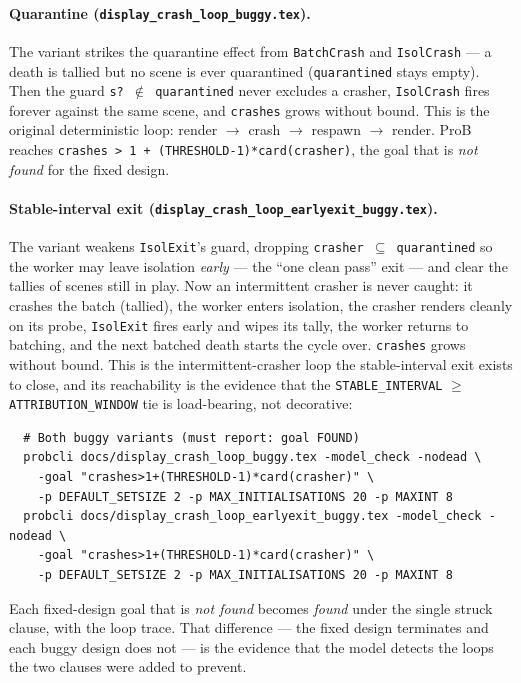 \documentclass[a4paper,10pt,fleqn]{article}
\begin{document}
\paragraph{Quarantine (\texttt{display\_crash\_loop\_buggy.tex}).}
The variant strikes the quarantine effect from \texttt{BatchCrash} and
\texttt{IsolCrash} --- a death is tallied but no scene is ever quarantined
(\texttt{quarantined} stays empty).  Then the guard \texttt{s? $\notin$
quarantined} never excludes a crasher, \texttt{IsolCrash} fires forever against
the same scene, and \texttt{crashes} grows without bound.  This is the original
deterministic loop: render $\to$ crash $\to$ respawn $\to$ render.  ProB reaches
\texttt{crashes > 1 + (THRESHOLD-1)*card(crasher)}, the goal that is \emph{not
found} for the fixed design.

\paragraph{Stable-interval exit
(\texttt{display\_crash\_loop\_earlyexit\_buggy.tex}).}
The variant weakens \texttt{IsolExit}'s guard, dropping \texttt{crasher $\subseteq$
quarantined} so the worker may leave isolation \emph{early} --- the ``one clean
pass'' exit --- and clear the tallies of scenes still in play.  Now an intermittent
crasher is never caught: it crashes the batch (tallied), the worker enters
isolation, the crasher renders cleanly on its probe, \texttt{IsolExit} fires early
and wipes its tally, the worker returns to batching, and the next batched death
starts the cycle over.  \texttt{crashes} grows without bound.  This is the
intermittent-crasher loop the stable-interval exit exists to close, and its
reachability is the evidence that the \texttt{STABLE\_INTERVAL} $\geq$
\texttt{ATTRIBUTION\_WINDOW} tie is load-bearing, not decorative:
\begin{verbatim}
  # Both buggy variants (must report: goal FOUND)
  probcli docs/display_crash_loop_buggy.tex -model_check -nodead \
    -goal "crashes>1+(THRESHOLD-1)*card(crasher)" \
    -p DEFAULT_SETSIZE 2 -p MAX_INITIALISATIONS 20 -p MAXINT 8
  probcli docs/display_crash_loop_earlyexit_buggy.tex -model_check -nodead \
    -goal "crashes>1+(THRESHOLD-1)*card(crasher)" \
    -p DEFAULT_SETSIZE 2 -p MAX_INITIALISATIONS 20 -p MAXINT 8
\end{verbatim}

Each fixed-design goal that is \emph{not found} becomes \emph{found} under the
single struck clause, with the loop trace.  That difference --- the fixed design
terminates and each buggy design does not --- is the evidence that the model
detects the loops the two clauses were added to prevent.
\end{document}
